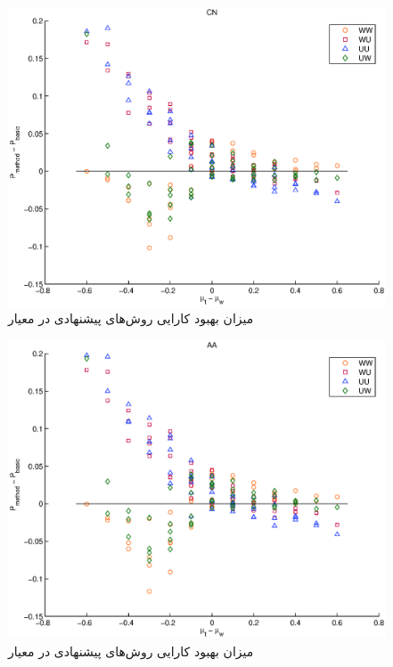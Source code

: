 \begin{figure}[!htb]
  \begin{center}
    \includegraphics[width=12cm]{scatter_diff_CN.eps}
    \caption{میزان بهبود کارایی روش‌های پیشنهادی در معیار }
    \label{fig:scatter_diff_CN}
  \end{center}
\end{figure}
\begin{figure}[!htb]
  \begin{center}
    \includegraphics[width=12cm]{scatter_diff_AA.eps}
    \caption{میزان بهبود کارایی روش‌های پیشنهادی در معیار }
    \label{fig:scatter_diff_AA}
  \end{center}
\end{figure}
